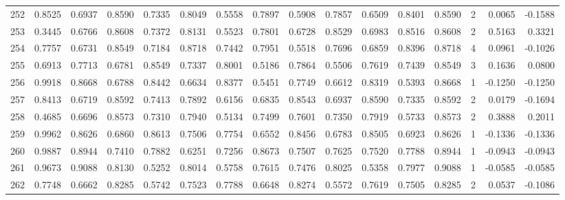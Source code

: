 \begin{tabular}{lrrrrrrrrrrrrrrr}
252 &      0.8525 &  0.6937 &  0.8590 &  0.7335 &  0.8049 &  0.5558 &  0.7897 &  0.5908 &  0.7857 &  0.6509 &   0.8401 &     0.8590 &      2 &                    0.0065 &                    -0.1588 \\
253 &      0.3445 &  0.6766 &  0.8608 &  0.7372 &  0.8131 &  0.5523 &  0.7801 &  0.6728 &  0.8529 &  0.6983 &   0.8516 &     0.8608 &      2 &                    0.5163 &                     0.3321 \\
254 &      0.7757 &  0.6731 &  0.8549 &  0.7184 &  0.8718 &  0.7442 &  0.7951 &  0.5518 &  0.7696 &  0.6859 &   0.8396 &     0.8718 &      4 &                    0.0961 &                    -0.1026 \\
255 &      0.6913 &  0.7713 &  0.6781 &  0.8549 &  0.7337 &  0.8001 &  0.5186 &  0.7864 &  0.5506 &  0.7619 &   0.7439 &     0.8549 &      3 &                    0.1636 &                     0.0800 \\
256 &      0.9918 &  0.8668 &  0.6788 &  0.8442 &  0.6634 &  0.8377 &  0.5451 &  0.7749 &  0.6612 &  0.8319 &   0.5393 &     0.8668 &      1 &                   -0.1250 &                    -0.1250 \\
257 &      0.8413 &  0.6719 &  0.8592 &  0.7413 &  0.7892 &  0.6156 &  0.6835 &  0.8543 &  0.6937 &  0.8590 &   0.7335 &     0.8592 &      2 &                    0.0179 &                    -0.1694 \\
258 &      0.4685 &  0.6696 &  0.8573 &  0.7310 &  0.7940 &  0.5134 &  0.7499 &  0.7601 &  0.7350 &  0.7919 &   0.5733 &     0.8573 &      2 &                    0.3888 &                     0.2011 \\
259 &      0.9962 &  0.8626 &  0.6860 &  0.8613 &  0.7506 &  0.7754 &  0.6552 &  0.8456 &  0.6783 &  0.8505 &   0.6923 &     0.8626 &      1 &                   -0.1336 &                    -0.1336 \\
260 &      0.9887 &  0.8944 &  0.7410 &  0.7882 &  0.6251 &  0.7256 &  0.8673 &  0.7507 &  0.7625 &  0.7520 &   0.7788 &     0.8944 &      1 &                   -0.0943 &                    -0.0943 \\
261 &      0.9673 &  0.9088 &  0.8130 &  0.5252 &  0.8014 &  0.5758 &  0.7615 &  0.7476 &  0.8025 &  0.5358 &   0.7977 &     0.9088 &      1 &                   -0.0585 &                    -0.0585 \\
262 &      0.7748 &  0.6662 &  0.8285 &  0.5742 &  0.7523 &  0.7788 &  0.6648 &  0.8274 &  0.5572 &  0.7619 &   0.7505 &     0.8285 &      2 &                    0.0537 &                    -0.1086 \\

\end{tabular}
